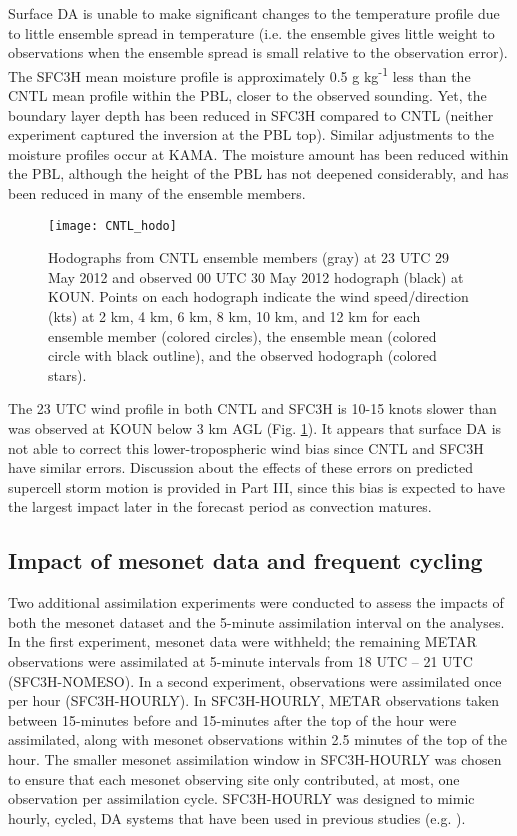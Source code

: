 Surface DA is unable to make significant changes to the temperature profile due to little ensemble spread in temperature (i.e. the ensemble gives little weight to observations when the ensemble spread is small relative to the observation error). The SFC3H mean moisture profile is approximately 0.5 g kg\textsuperscript{-1} less than the CNTL mean profile within the PBL, closer to the observed sounding. Yet, the boundary layer depth has been reduced in SFC3H compared to CNTL (neither experiment captured the inversion at the PBL top). Similar adjustments to the moisture profiles occur at KAMA. The moisture amount has been reduced within the PBL, although the height of the PBL has not deepened considerably, and has been reduced in many of the ensemble members.
\begin{figure}
\centering
\texttt{[image: CNTL\_hodo]}
\caption{Hodographs from CNTL ensemble members (gray) at 23 UTC 29 May 2012 and observed 00 UTC 30 May 2012 hodograph (black) at KOUN. Points on each hodograph indicate the wind speed/direction (kts) at 2 km, 4 km, 6 km, 8 km, 10 km, and 12 km for each ensemble member (colored circles), the ensemble mean (colored circle with black outline), and the observed hodograph (colored stars).}
\label{hodo}
\end{figure}

The 23 UTC wind profile in both CNTL and SFC3H is 10-15 knots slower than was observed at KOUN below 3 km AGL (Fig. \ref{hodo}). It appears that surface DA is not able to correct this lower-tropospheric wind bias since CNTL and SFC3H have similar errors. Discussion about the effects of these errors on predicted supercell storm motion is provided in Part III, since this bias is expected to have the largest impact later in the forecast period as convection matures.

\subsection{Impact of mesonet data and frequent cycling}
Two additional assimilation experiments were conducted to assess the impacts of both the mesonet dataset and the 5-minute assimilation interval on the analyses. In the first experiment, mesonet data were withheld; the remaining METAR observations were assimilated at 5-minute intervals from 18 UTC -- 21 UTC (SFC3H-NOMESO). In a second experiment, observations were assimilated once per hour (SFC3H-HOURLY). In SFC3H-HOURLY, METAR observations taken between 15-minutes before and 15-minutes after the top of the hour were assimilated, along with mesonet observations within 2.5 minutes of the top of the hour. The smaller mesonet assimilation window in SFC3H-HOURLY was chosen to ensure that each mesonet observing site only contributed, at most, one observation per assimilation cycle. SFC3H-HOURLY was designed to mimic hourly, cycled, DA systems that have been used in previous studies (e.g. \citealt{wheatleyetal12}).

